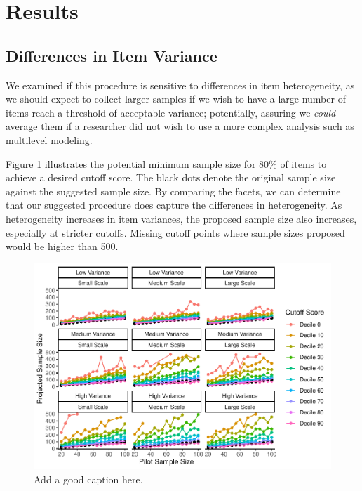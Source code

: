 \documentclass[
  man]{apa6}
\begin{document}
\hypertarget{results}{%
\section{Results}\label{results}}

\hypertarget{differences-in-item-variance}{%
\subsection{Differences in Item Variance}\label{differences-in-item-variance}}

We examined if this procedure is sensitive to differences in item heterogeneity, as we should expect to collect larger samples if we wish to have a large number of items reach a threshold of acceptable variance; potentially, assuring we \emph{could} average them if a researcher did not wish to use a more complex analysis such as multilevel modeling.

Figure \ref{fig:item-figure} illustrates the potential minimum sample size for 80\% of items to achieve a desired cutoff score. The black dots denote the original sample size against the suggested sample size. By comparing the facets, we can determine that our suggested procedure does capture the differences in heterogeneity. As heterogeneity increases in item variances, the proposed sample size also increases, especially at stricter cutoffs. Missing cutoff points where sample sizes proposed would be higher than 500.

\begin{figure}
\centering
\includegraphics{manuscript_draft_files/figure-latex/item-figure-1.pdf}
\caption{\label{fig:item-figure}Add a good caption here.}
\end{figure}
\end{document}
